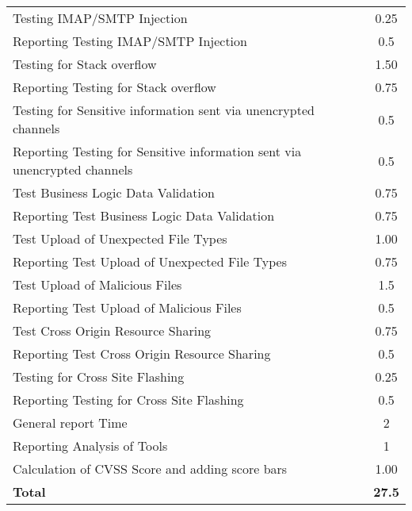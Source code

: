 \begin{table}[H]
\begin{tabular*}{\textwidth}{@{\extracolsep{\fill}} l c@{\extracolsep{0pt}} }
Testing IMAP/SMTP Injection                 & 0.25 \\
Reporting Testing IMAP/SMTP Injection       & 0.5 \\
Testing for Stack overflow                  & 1.50 \\
Reporting Testing for Stack overflow        & 0.75 \\
Testing for Sensitive information sent via unencrypted channels & 0.5 \\
Reporting Testing for Sensitive information sent via unencrypted channels & 0.5 \\
Test Business Logic Data Validation         & 0.75 \\
Reporting Test Business Logic Data Validation & 0.75 \\
Test Upload of Unexpected File Types        & 1.00 \\
Reporting Test Upload of Unexpected File Types & 0.75 \\
Test Upload of Malicious Files              & 1.5 \\
Reporting Test Upload of Malicious Files    & 0.5 \\
Test Cross Origin Resource Sharing          & 0.75 \\
Reporting Test Cross Origin Resource Sharing & 0.5 \\
Testing for Cross Site Flashing             & 0.25 \\
Reporting Testing for Cross Site Flashing   & 0.5 \\
General report Time							& 2 \\
Reporting Analysis of Tools                 & 1 \\
Calculation of CVSS Score and adding score bars	& 1.00 \\ \hline\hline
\textbf{Total}								& \textbf{27.5}
\end{tabular*}
\end{table}
\clearpage

